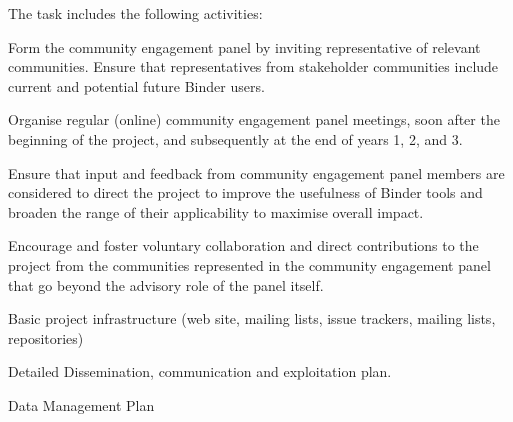 \begin{workpackage}[id=management,type=MGT,wphases=0-36!.44,
  title=Project Management,
  short=Management,
  lead=SRL,
  MPRM=1,
  QSRM=1,
  IFRRM=1,
  UIORM=1,
  SRLRM=12,
  swsites
]
\begin{tasklist}
\begin{task}[
  title=Community Engagement Panel,
  id=community-engagement-panel,
  lead=SRL,
  PM=2,
  wphases={0-36!.056},
  partners={MP,QS,UIO,IFR},
  ]

The task includes the following activities:
\begin{compactenum}
\item Form the community engagement panel by inviting representative of relevant
  communities. Ensure that representatives from stakeholder communities include
  current and potential future Binder users.
\item Organise regular (online) community engagement panel meetings, soon after the
  beginning of the project, and subsequently at the end of years 1, 2, and 3.
\item Ensure that input and feedback from community engagement panel members are
  considered to direct the project to improve the usefulness of Binder tools
  and broaden the range of their applicability to maximise overall impact.
\item Encourage and foster voluntary collaboration and direct contributions to
  the project from the communities represented in the community engagement
  panel that go beyond the advisory role of the panel itself.
\end{compactenum}

\end{task}
\end{tasklist}


\begin{wpdelivs}

\begin{wpdeliv}[due=2,id=infrastructure,dissem=PU,nature=DEC,lead=SRL]
  {Basic project infrastructure (web site, mailing lists, issue trackers, mailing lists, repositories)}
\end{wpdeliv}


  \begin{wpdeliv}[due=3,id=dissemination-plan,dissem=PU,nature=R,lead=SRL]
    {Detailed Dissemination, communication and exploitation plan.}
  \end{wpdeliv}


\begin{wpdeliv}[due=6,id=data-management-plan,dissem=PU,nature=R,lead=SRL]
  {Data Management Plan}
\end{wpdeliv}


\end{wpdelivs}
\end{workpackage}
